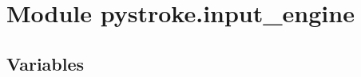 %
%
%


\section{Module pystroke.input\_engine}

    \label{pystroke:input_engine}


  \subsection{Variables}

